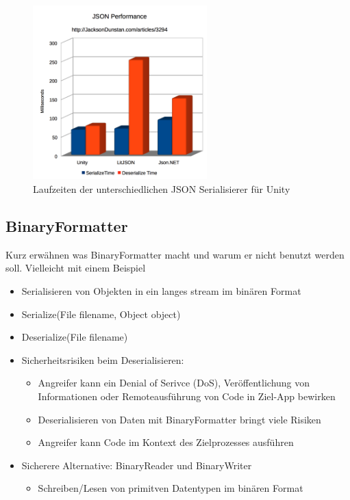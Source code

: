 \begin{figure}[htp]
    \centering
    \includegraphics[width=0.6\textwidth]{images/UnityJsonPerformance.png}
    \caption{Laufzeiten der unterschiedlichen JSON Serialisierer für Unity \cite{jacksondunstanJacksonDunstancomJSON}}
    \label{fig:unityJsonPerformance}
\end{figure}

\subsection{BinaryFormatter}
Kurz erwähnen was BinaryFormatter macht und warum er nicht benutzt werden soll. Vielleicht mit einem Beispiel

\begin{itemize}
    \item Serialisieren von Objekten in ein langes stream im binären Format
    \item Serialize(File filename, Object object)
    \item Deserialize(File filename)
    \item Sicherheitsrisiken beim Deserialisieren:
    \begin{itemize}
        \item Angreifer kann ein Denial of Serivce (DoS), Veröffentlichung von Informationen oder Remoteausführung von Code in Ziel-App bewirken
        \item Deserialisieren von Daten mit BinaryFormatter bringt viele Risiken
        \item Angreifer kann Code im Kontext des Zielprozesses ausführen
    \end{itemize}
    \item Sicherere Alternative: BinaryReader und BinaryWriter
    \begin{itemize}
        \item Schreiben/Lesen von primitven Datentypen im binären Format
    \end{itemize}
\end{itemize}

